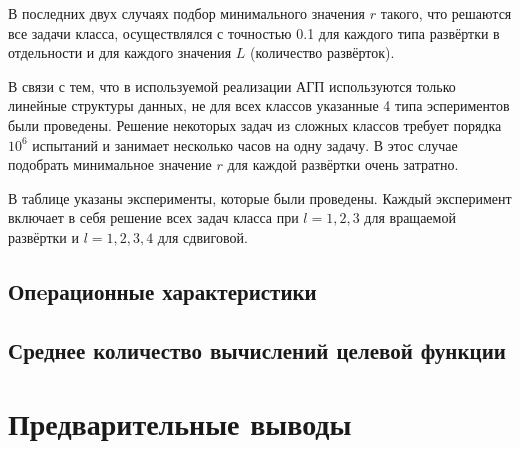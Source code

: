 \documentclass[a4paper]{article}
\begin{document}
В последних двух случаях подбор минимального значения $r$ такого, что решаются все задачи класса, осуществлялся с точностью 0.1 для каждого типа
развёртки в отдельности и для каждого значения $L$ (количество развёрток).

В связи с тем, что в используемой реализации АГП используются только линейные структуры данных, не для всех классов указанные 4 типа эспериментов были проведены. Решение некоторых задач из сложных классов требует порядка $10^6$ испытаний и занимает несколько часов на одну задачу. В этос случае подобрать минимальное значение $r$ для каждой развёртки очень затратно.

В таблице указаны эксперименты, которые были проведены. Каждый эксперимент включает в себя решение всех задач класса при $l=1,2,3$ для вращаемой развёртки и
$l=1,2,3,4$ для сдвиговой.


\subsection{Опeрационные характеристики}

\subsection{Среднее количество вычислений целевой функции}

\section{Предварительные выводы}
\end{document}
